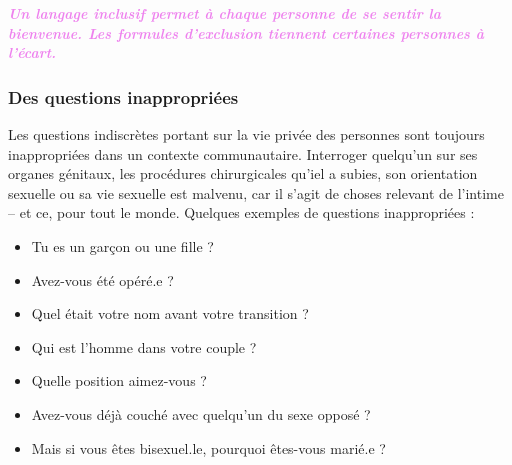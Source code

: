 \documentclass[12pt,openany]{book}
\renewenvironment{quote}{%
  \list{}{%
    \leftmargin-0.1cm   %
    \rightmargin\leftmargin
  }
  \item\relax
}
{\endlist}
\begin{document}
\begin{quote}
\centering
\doublespacing
\textit{\Large \textcolor{violet}{\textbf{Un langage inclusif permet à chaque personne de se sentir la bienvenue. Les formules d’exclusion tiennent certaines personnes à l’écart.}}}
\end{quote}

\begin{figure}[h]
    \centering
\end{figure}

\subsubsection*{Des questions inappropriées}

\noindent Les questions indiscrètes portant sur la vie privée des personnes sont toujours inappropriées dans un contexte communautaire. Interroger quelqu’un sur ses organes génitaux, les procédures chirurgicales qu’iel a subies, son orientation sexuelle ou sa vie sexuelle est malvenu, car il s’agit de choses relevant de l’intime – et ce, pour tout le monde.
Quelques exemples de questions inappropriées :

\begin{itemize}[label=\textbullet]
  \setlength\itemsep{-0.3em}
  \item Tu es un garçon ou une fille ?
  \item Avez-vous été opéré.e ?
  \item Quel était votre nom avant votre transition ?
  \item Qui est l’homme dans votre couple ?
  \item Quelle position aimez-vous ?
  \item Avez-vous déjà couché avec quelqu’un du sexe opposé ?
  \item Mais si vous êtes bisexuel.le, pourquoi êtes-vous marié.e ?
\end{itemize}
\end{document}
